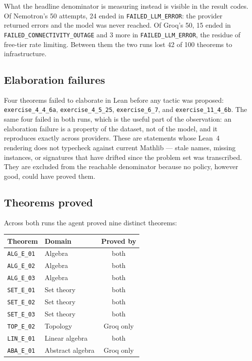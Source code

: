 What the headline denominator is measuring instead is visible in the result codes.
Of Nemotron's 50 attempts, 24 ended in \texttt{FAILED\_LLM\_ERROR}: the provider
returned errors and the model was never reached.
Of Groq's 50, 15 ended in \texttt{FAILED\_CONNECTIVITY\_OUTAGE} and 3 more in
\texttt{FAILED\_LLM\_ERROR}, the residue of free-tier rate limiting.
Between them the two runs lost 42 of 100 theorems to infrastructure.

\subsection{Elaboration failures}

Four theorems failed to elaborate in Lean before any tactic was proposed:
\texttt{exercise\_4\_4\_6a}, \texttt{exercise\_4\_5\_25}, \texttt{exercise\_6\_7},
and \texttt{exercise\_11\_4\_6b}.
The same four failed in both runs, which is the useful part of the observation:
an elaboration failure is a property of the dataset, not of the model, and it
reproduces exactly across providers.
These are statements whose Lean~4 rendering does not typecheck against current
Mathlib --- stale names, missing instances, or signatures that have drifted since
the problem set was transcribed.
They are excluded from the reachable denominator because no policy, however good,
could have proved them.

\subsection{Theorems proved}

Across both runs the agent proved nine distinct theorems:

\begin{center}
\begin{tabular}{@{}llc@{}}
\hline
\textbf{Theorem} & \textbf{Domain} & \textbf{Proved by} \\
\hline
\texttt{ALG\_E\_01} & Algebra          & both \\
\texttt{ALG\_E\_02} & Algebra          & both \\
\texttt{ALG\_E\_03} & Algebra          & both \\
\texttt{SET\_E\_01} & Set theory       & both \\
\texttt{SET\_E\_02} & Set theory       & both \\
\texttt{SET\_E\_03} & Set theory       & both \\
\texttt{TOP\_E\_02} & Topology         & Groq only \\
\texttt{LIN\_E\_01} & Linear algebra   & both \\
\texttt{ABA\_E\_01} & Abstract algebra & Groq only \\
\hline
\end{tabular}
\end{center}

